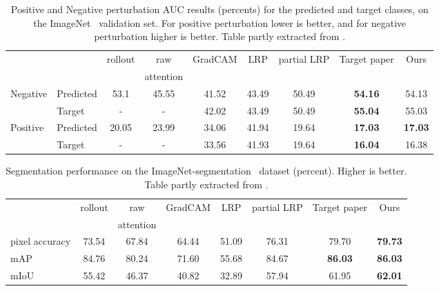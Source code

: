 \setlength\tabcolsep{2pt}
\begin{table*}[!h]
    \centering
    \begin{tabular*}{\linewidth}{@{\extracolsep{\fill}}llccccccc}
        \toprule
        &&rollout & raw  & GradCAM & LRP & partial LRP & Target paper & Ours\\
        & &~\cite{samira2005} & attention &~\cite{selvaraju2017grad} &~\cite{binder2016layer} &~\cite{voita2019analyzing} &~\cite{mainpaper} & \\
        \midrule
        \multirow{2}{*}{Negative} &Predicted & 53.1 & 45.55 & 41.52 & 43.49 & 50.49 & \textbf{54.16} & 54.13\\
        &Target & - & - & 42.02 & 43.49 & 50.49 & \textbf{55.04} & 55.03 \\
        \midrule
        \multirow{2}{*}{Positive} &Predicted & 20.05 & 23.99 & 34.06 & 41.94 & 19.64 & \textbf{17.03} & \textbf{17.03}\\
        &Target & - & - & 33.56 & 41.93 & 19.64 & \textbf{16.04} & 16.38\\
        \bottomrule
    \end{tabular*}
    \caption{Positive and Negative perturbation AUC results (percents) for the predicted and target classes, on the ImageNet~\cite{russakovsky2015ImageNet} validation set. For positive perturbation lower is better, and for negative perturbation higher is better. Table partly extracted from \cite{mainpaper}.}
    \label{tab:perturbations}
\end{table*}
    \medskip

\begin{table*}[!h]
    \begin{tabular*}{\linewidth}{@{\extracolsep{\fill}}lccccccc}
        \toprule
        &rollout & raw  & GradCAM & LRP & partial LRP & Target paper & Ours\\
        &~\cite{samira2005} & attention &~\cite{selvaraju2017grad} &~\cite{binder2016layer} &~\cite{voita2019analyzing} &~\cite{mainpaper} & \\
        \midrule
        pixel accuracy & 73.54 & 67.84 & 64.44 & 51.09 & 76.31 & 79.70 & \textbf{79.73}\\
        mAP & 84.76 & 80.24 & 71.60 & 55.68 & 84.67 & \textbf{86.03} & \textbf{86.03}\\
        mIoU & 55.42 & 46.37 & 40.82 & 32.89 & 57.94 & 61.95 & \textbf{62.01}\\
        \bottomrule
    \end{tabular*}
    \caption{Segmentation performance on the ImageNet-segmentation~\cite{imagenet-seg} dataset (percent). Higher is better. Table partly extracted from \cite{mainpaper}.}
    \label{tab:segmentation}
\end{table*}


